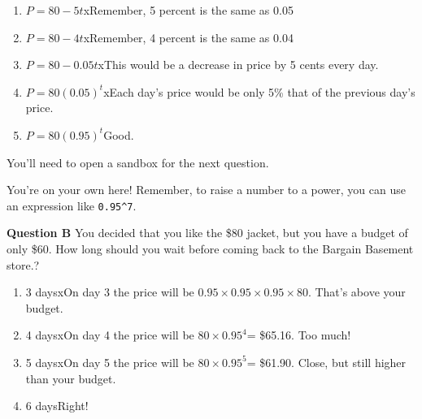 \documentclass[
  letterpaper,
  DIV=11,
  numbers=noendperiod,
  oneside]{article}
\providecommand{\tightlist}{%
  \setlength{\itemsep}{0pt}\setlength{\parskip}{0pt}}\usepackage{longtable,booktabs,array}
\begin{document}
\begin{multicols}{2}
\begin{table}
\begin{minipage}[t]{\linewidth}
{\begin{enumerate}
\def\labelenumi{\roman{enumi}.}
\tightlist
\item
  {\(P = 80 - 5t\){xRemember, 5 percent is the same as 0.05}}\\
\item
  {\(P = 80 - 4t\){xRemember, 4 percent is the same as 0.04}}\\
\item
  {\(P = 80 - 0.05t\){xThis would be a decrease in price by 5 cents
  every day.}}\\
\item
  {\(P = 80 (0.05)^t\){xEach day's price would be only 5\% that of the
  previous day's price.}}\\
\item
  {\(P = 80 (0.95)^t\){Good.~}}
\end{enumerate}

}

\end{minipage}%
\newline
\begin{minipage}[t]{\linewidth}

{\centering 

You'll need to open a sandbox for the next question.

}

\end{minipage}%
\newline
\begin{minipage}[t]{\linewidth}

{\centering 

You're on your own here! Remember, to raise a number to a power, you can
use an expression like \texttt{0.95\^{}7}.

}

\end{minipage}%
\newline
\begin{minipage}[t]{\linewidth}

{\centering 

\textbf{Question B} You decided that you like the \$80 jacket, but you
have a budget of only \$60. How long should you wait before coming back
to the Bargain Basement store.?

\begin{enumerate}
\def\labelenumi{\roman{enumi}.}
\tightlist
\item
  {3 days{xOn day 3 the price will be
  \(0.95\times 0.95 \times 0.95 \times 80\). That's above your
  budget.}}\\
\item
  {4 days{xOn day 4 the price will be \(80 \times 0.95^4\)= \$65.16.
  Too much!}}\\
\item
  {5 days{xOn day 5 the price will be \(80 \times 0.95^5\)= \$61.90.
  Close, but still higher than your budget.}}\\
\item
  {6 days{Right!~}}
\end{enumerate}

}
\end{minipage}
\end{table}
\end{multicols}
\end{document}
